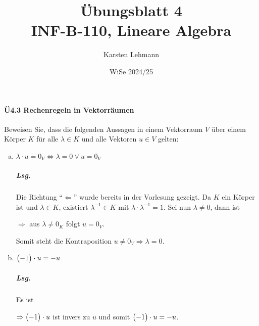 \documentclass{scrreprt}
\author{Karsten Lehmann}
\date{WiSe 2024/25}
\title{Übungsblatt 4\\INF-B-110, Lineare Algebra}
\begin{document}
\paragraph{Ü4.3 Rechenregeln in Vektorräumen}
Beweisen Sie, dass die folgenden Aussagen in einem Vektorraum $V$ über einem
Körper $K$ für alle $\lambda \in K$ und alle Vektoren $u \in V$ gelten:
\begin{enumerate}[(a)]
\item $\lambda \cdot u = 0_V \iff \lambda = 0 \lor u = 0_V$

  \subparagraph{Lsg.} Die Richtung ``$\Leftarrow$'' wurde bereits in der Vorlesung gezeigt.
  Da $K$ ein Körper ist und $\lambda \in K$, existiert $\lambda^{-1} \in K$ mit
  $\lambda \cdot \lambda^{-1} = 1$.
  Sei nun $\lambda \ne 0$, dann ist

  $\Rightarrow$ aus $\lambda \ne 0_K$ folgt $u = 0_V$.

  Somit steht die Kontraposition $u \ne 0_V \Rightarrow \lambda = 0$.

\item $\qty\big(-1) \cdot u = -u$

  \subparagraph{Lsg.} Es ist

  $\Rightarrow \qty\big(-1) \cdot u$ ist invers zu $u$ und somit
  $\qty\big(-1) \cdot u = -u$.


\end{enumerate}
\end{document}
